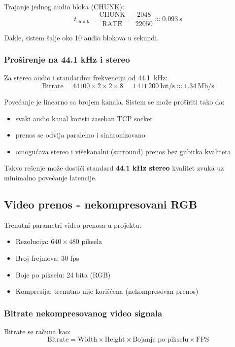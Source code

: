 \documentclass[a4paper,12pt]{article}
\begin{document}
Trajanje jednog audio bloka (CHUNK):
\[
t_\text{chunk} = \frac{\text{CHUNK}}{\text{RATE}} = \frac{2048}{22050} \approx 0.093~\text{s}
\]

Dakle, sistem šalje oko 10 audio blokova u sekundi.

\subsubsection*{Proširenje na 44.1 kHz i stereo}

Za stereo audio i standardnu frekvenciju od 44.1~kHz:
\[
\text{Bitrate} = 44100 \times 2 \times 2 \times 8 = 1\,411\,200~\text{bit/s} \approx 1.34~\text{Mb/s}
\]

Povećanje je linearno sa brojem kanala.  
Sistem se može proširiti tako da:
\begin{itemize}
    \item svaki audio kanal koristi zaseban TCP socket
    \item prenos se odvija paralelno i sinhronizovano
    \item omogućava stereo i višekanalni (surround) prenos bez gubitka kvaliteta
\end{itemize}

Takvo rešenje može dostići standard \textbf{44.1 kHz stereo} kvalitet zvuka uz minimalno povećanje latencije.

\subsection{Video prenos - nekompresovani RGB}

Trenutni parametri video prenosa u projektu:

\begin{itemize}
    \item Rezolucija: $640 \times 480$ piksela
    \item Broj frejmova: 30 fps
    \item Boje po pikselu: 24 bita (RGB)
    \item Kompresija: trenutno nije korišćena (nekompresovan prenos)
\end{itemize}

\subsubsection*{Bitrate nekompresovanog video signala}

Bitrate se računa kao:
\[
\text{Bitrate} = \text{Width} \times \text{Height} \times \text{Bojanje po pikselu} \times \text{FPS}
\]
\end{document}
